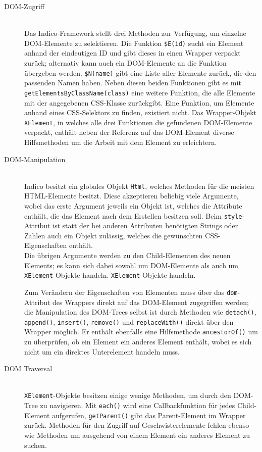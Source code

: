 \begin{description}
\item[DOM-Zugriff] \hfill \\
Das Indico-Framework stellt drei Methoden zur Verfügung, um einzelne DOM-Elemente zu selektieren.
Die Funktion \lstinline{$E(id)} sucht ein Element anhand der eindeutigen ID und gibt dieses in
einen Wrapper verpackt zurück; alternativ kann auch ein DOM-Elemente an die Funktion übergeben
werden. \lstinline{$N(name)} gibt eine Liste aller Elemente zurück, die den
passenden Namen haben. Neben diesen beiden Funktionen gibt es mit
\lstinline{getElementsByClassName(class)} eine weitere Funktion, die alle Elemente mit der
angegebenen CSS-Klasse zurückgibt. Eine Funktion, um Elemente anhand eines CSS-Selektors zu finden,
existiert nicht. Das Wrapper-Objekt \lstinline{XElement}, in welches alle drei Funktionen die
gefundenen DOM-Elemente verpackt, enthält neben der Referenz auf das DOM-Element diverse
Hilfsmethoden um die Arbeit mit dem Element zu erleichtern.

\item[DOM-Manipulation] \hfill \\
Indico besitzt ein globales Objekt \lstinline{Html}, welches Methoden für die meisten HTML-Elemente
besitzt. Diese akzeptieren beliebig viele Argumente, wobei das erste Argument jeweils ein Objekt
ist, welches die Attribute enthält, die das Element nach dem Erstellen besitzen soll. Beim
\lstinline{style}-Attribut ist statt der bei anderen Attributen benötigten Strings oder Zahlen auch
ein Objekt zulässig, welches die gewünschten CSS-Eigenschaften enthält. \\
Die übrigen Argumente werden zu den Child-Elementen des neuen Elements; es kann sich dabei sowohl um
DOM-Elemente als auch um \lstinline{XElement}-Objekte handeln.
\lstinline{XElement}-Objekte handeln.

Zum Verändern der Eigenschaften von Elementen muss über das \lstinline{dom}-Attribut des Wrappers
direkt auf das DOM-Element zugegriffen werden; die Manipulation des DOM-Trees selbst ist durch
Methoden wie \lstinline{detach()}, \lstinline{append()}, \lstinline{insert()}, \lstinline{remove()}
und \lstinline{replaceWith()} direkt über den Wrapper möglich. Er enthält ebenfalls eine
Hilfsmethode \lstinline{ancestorOf()} um zu überprüfen, ob ein Element ein anderes Element enthält,
wobei es sich nicht um ein direktes Unterelement handeln muss.

\item[DOM Traversal] \hfill \\
\lstinline{XElement}-Objekte besitzen einige wenige Methoden, um durch den DOM-Tree zu navigieren.
Mit \lstinline{each()} wird eine Callbackfunktion für jedes Child-Element aufgerufen,
\lstinline{getParent()} gibt das Parent-Element im Wrapper zurück. Methoden für den Zugriff auf
Geschwisterelemente fehlen ebenso wie Methoden um ausgehend von einem Element ein anderes Element zu
suchen.


\end{description}
